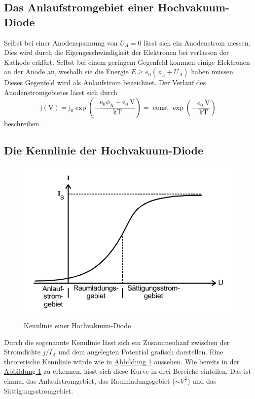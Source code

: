 \subsection{Das Anlaufstromgebiet einer Hochvakuum-Diode}
Selbst bei einer Anodenspannung von $U_A = 0$ lässt sich ein Anodenstrom messen.
Dies wird durch die Eigengeschwindigkeit der Elektronen bei verlassen der Kathode erklärt.
Selbst bei einem geringem Gegenfeld kommen einige Elektronen an der Anode an, weshalb sie die Energie $E \geq e_0 (\phi_A + U_A)$ haben müssen.
Dieses Gegenfeld wird als Anlaufstrom bezeichnet.
Der Verlauf des Anodenstromgebietes lässt sich durch
\begin{equation}\label{eq:anlaufstromgebiet}
    \mathrm{j}(\mathrm{V})=\mathrm{j}_{0} \exp \left(-\frac{\mathrm{e}_{0} \phi_{\mathrm{A}}+\mathrm{e}_{0} \mathrm{~V}}{\mathrm{kT}}\right)=\text { const } \exp \left(-\frac{\mathrm{e}_{0} \mathrm{~V}}{\mathrm{kT}}\right)
\end{equation}
beschreiben.

\subsection{Die Kennlinie der Hochvakuum-Diode}
\begin{figure}
    \center
    \caption{Kennlinie einer Hochvakuum-Diode}\label{fig:KennlinieTheorie}
    \includegraphics[width=0.8\linewidth]{pictures/KennlinieTheorie.pdf}
\end{figure}
Durch die sogenannte Kennlinie lässt sich ein Zusammenhanf zwischen der Stromdichte $j / I_A$ und dem angelegten Potential
grafisch darstellen.
Eine theoretische Kennlinie würde wie in \hyperref[fig:KennlinieTheorie]{Abbildung \ref{fig:KennlinieTheorie}} aussehen.
Wie bereits in der \hyperref[fig:KennlinieTheorie]{Abbildung \ref{fig:KennlinieTheorie}} zu erkennen, lässt sich diese Kurve in drei Bereiche einteilen.
Das ist einmal das Anlaufstromgebiet, das Raumladungsgebiet ($\sim V^{\frac{3}{2}}$) und das Sättigungsstromgebiet.